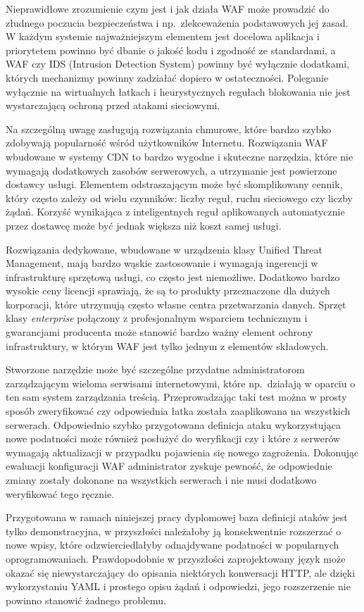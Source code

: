 \documentclass[11pt,a4paper,polish,thesis]{dcsbook}
\begin{document}
Nieprawidłowe zrozumienie czym jest i jak działa WAF może prowadzić do złudnego poczucia bezpieczeństwa i np.~zlekceważenia podstawowych jej zasad. W każdym systemie najważniejszym elementem jest docelowa aplikacja i priorytetem powinno być dbanie o jakość kodu i zgodność ze standardami, a WAF czy IDS (Intrusion Detection System) powinny być wyłącznie dodatkami, których mechanizmy powinny zadziałać dopiero w ostateczności. Poleganie wyłącznie na wirtualnych łatkach i heurystycznych regułach blokowania nie jest wystarczającą ochroną przed atakami sieciowymi.

Na szczególną uwagę zasługują rozwiązania chmurowe, które bardzo szybko zdobywają popularność wśród użytkowników Internetu. Rozwiązania WAF wbudowane w systemy CDN to bardzo wygodne i skuteczne narzędzia, które nie wymagają dodatkowych zasobów serwerowych, a utrzymanie jest powierzone dostawcy usługi. Elementem odstraszającym może być skomplikowany cennik, który często zależy od wielu czynników: liczby reguł, ruchu sieciowego czy liczby żądań. Korzyść wynikająca z inteligentnych reguł aplikowanych automatycznie przez dostawcę może być jednak większa niż koszt samej usługi.

Rozwiązania dedykowane, wbudowane w urządzenia klasy Unified Threat Management, mają bardzo wąskie zastosowanie i wymagają ingerencji w infrastrukturę sprzętową usługi, co często jest niemożliwe. Dodatkowo bardzo wysokie ceny licencji sprawiają, że są to produkty przeznaczone dla dużych korporacji, które utrzymują często własne centra przetwarzania danych. Sprzęt klasy \textit{enterprise} połączony z profesjonalnym wsparciem technicznym i gwarancjami producenta może stanowić bardzo ważny element ochrony infrastruktury, w którym WAF jest tylko jednym z elementów składowych.

Stworzone narzędzie może być szczególne przydatne administratorom zarządzającym wieloma serwisami internetowymi, które np.~działają w oparciu o ten sam system zarządzania treścią. Przeprowadzając taki test można w prosty sposób zweryfikować czy odpowiednia łatka została zaaplikowana na wszystkich serwerach. Odpowiednio szybko przygotowana definicja ataku wykorzystująca nowe podatności może również posłużyć do weryfikacji czy i które z serwerów wymagają aktualizacji w przypadku pojawienia się nowego zagrożenia. Dokonując ewaluacji konfiguracji WAF administrator zyskuje pewność, że odpowiednie zmiany zostały dokonane na wszystkich serwerach i nie musi dodatkowo weryfikować tego ręcznie.
 
Przygotowana w ramach niniejszej pracy dyplomowej baza definicji ataków jest tylko demonstracyjna, w przyszłości należałoby ją konsekwentnie rozszerzać o nowe wpisy, które odzwierciedlałyby odnajdywane podatności w popularnych oprogramowaniach. Prawdopodobnie w przyszłości zaprojektowany język może okazać się niewystarczający do opisania niektórych konwersacji HTTP, ale dzięki wykorzystaniu YAML i prostego opisu żądań i odpowiedzi, jego rozszerzenie nie powinno stanowić żadnego problemu.
\end{document}
